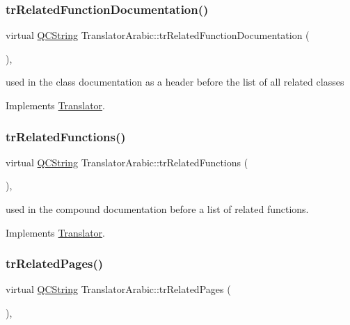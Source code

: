 \subsubsection{\texorpdfstring{trRelatedFunctionDocumentation()}{trRelatedFunctionDocumentation()}}
{\footnotesize\ttfamily virtual \mbox{\hyperlink{class_q_c_string}{Q\+C\+String}} Translator\+Arabic\+::tr\+Related\+Function\+Documentation (\begin{DoxyParamCaption}{ }\end{DoxyParamCaption})\hspace{0.3cm}{\ttfamily [inline]}, {\ttfamily [virtual]}}

used in the class documentation as a header before the list of all related classes 

Implements \mbox{\hyperlink{class_translator}{Translator}}.

\mbox{\label{class_translator_arabic_a922e7e458ef188c861da3972822b7f42}} 
\subsubsection{\texorpdfstring{trRelatedFunctions()}{trRelatedFunctions()}}
{\footnotesize\ttfamily virtual \mbox{\hyperlink{class_q_c_string}{Q\+C\+String}} Translator\+Arabic\+::tr\+Related\+Functions (\begin{DoxyParamCaption}{ }\end{DoxyParamCaption})\hspace{0.3cm}{\ttfamily [inline]}, {\ttfamily [virtual]}}

used in the compound documentation before a list of related functions. 

Implements \mbox{\hyperlink{class_translator}{Translator}}.

\mbox{\label{class_translator_arabic_a08ff492a2101669714711c5f1ba3b732}} 
\subsubsection{\texorpdfstring{trRelatedPages()}{trRelatedPages()}}
{\footnotesize\ttfamily virtual \mbox{\hyperlink{class_q_c_string}{Q\+C\+String}} Translator\+Arabic\+::tr\+Related\+Pages (\begin{DoxyParamCaption}{ }\end{DoxyParamCaption})\hspace{0.3cm}{\ttfamily [inline]}, {\ttfamily [virtual]}}

